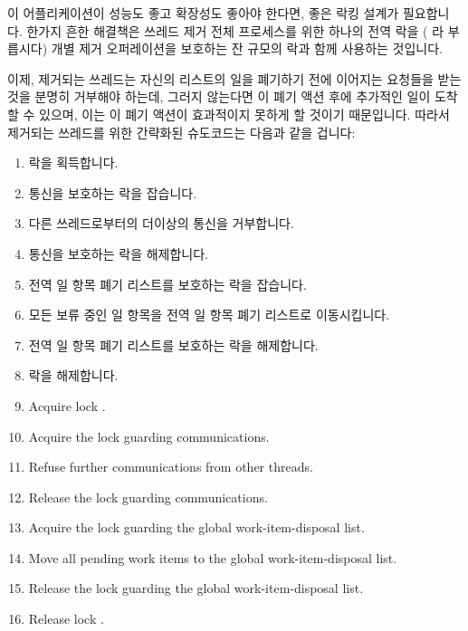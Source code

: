 {	\fi

	이 어플리케이션이 성능도 좋고 확장성도 좋아야 한다면, 좋은 락킹 설계가
	필요합니다.
	한가지 흔한 해결책은 쓰레드 제거 전체 프로세스를 위한 하나의 전역 락을
	( 라 부릅시다) 개별 제거 오퍼레이션을 보호하는 잔 규모의 락과
	함께 사용하는 것입니다.

	이제, 제거되는 쓰레드는 자신의 리스트의 일을 폐기하기 전에 이어지는
	요청들을 받는 것을 분명히 거부해야 하는데, 그러지 않는다면 이 폐기 액션
	후에 추가적인 일이 도착할 수 있으며, 이는 이 폐기 액션이 효과적이지
	못하게 할 것이기 때문입니다.
	따라서 제거되는 쓰레드를 위한 간략화된 슈도코드는 다음과 같을 겁니다:

	\begin{enumerate}
	\item	{} 락을 획득합니다.
	\item	통신을 보호하는 락을 잡습니다.
	\item	다른 쓰레드로부터의 더이상의 통신을 거부합니다.
	\item	통신을 보호하는 락을 해제합니다.
	\item	전역 일 항목 폐기 리스트를 보호하는 락을 잡습니다.
	\item	모든 보류 중인 일 항목을 전역 일 항목 폐기 리스트로
		이동시킵니다.
	\item	전역 일 항목 폐기 리스트를 보호하는 락을 해제합니다.
	\item	{} 락을 해제합니다.

	\iffalse

	\item	Acquire lock .
	\item	Acquire the lock guarding communications.
	\item	Refuse further communications from other threads.
	\item	Release the lock guarding communications.
	\item	Acquire the lock guarding the global work-item-disposal list.
	\item	Move all pending work items to the global
		work-item-disposal list.
	\item	Release the lock guarding the global work-item-disposal list.
	\item	Release lock .


\end{enumerate}}
